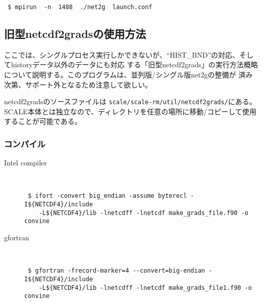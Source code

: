 \begin{verbatim}
 $ mpirun  -n  1488  ./net2g  launch.conf
\end{verbatim}



\subsection{旧型netcdf2gradsの使用方法}
ここでは、シングルプロセス実行しかできないが、``HIST\_BND''の対応、そしてhistoryデータ以外のデータにも対応
する「旧型netcdf2grads」の実行方法概略について説明する。このプログラムは、並列版/シングル版net2gの整備が
済み次第、サポート外となるため注意して欲しい。

netcdf2gradsのソースファイルは \verb|scale/scale-rm/util/netcdf2grads/|にある。
SCALE本体とは独立なので、ディレクトリを任意の場所に移動/コピーして使用することが可能である。

\subsubsection{コンパイル}
\begin{description}
\item[Intel compiler]\mbox{}\\
 \begin{verbatim}
 $ ifort -convert big_endian -assume byterecl -I${NETCDF4}/include 
    -L${NETCDF4}/lib -lnetcdff -lnetcdf make_grads_file.f90 -o convine
  \end{verbatim}
\item[gfortran]\mbox{}\\
\begin{verbatim}
 $ gfortran -frecord-marker=4 --convert=big-endian -I${NETCDF4}/include
    -L${NETCDF4}/lib -lnetcdff -lnetcdf make_grads_file1.f90 -o convine
\end{verbatim}
\end{description}


